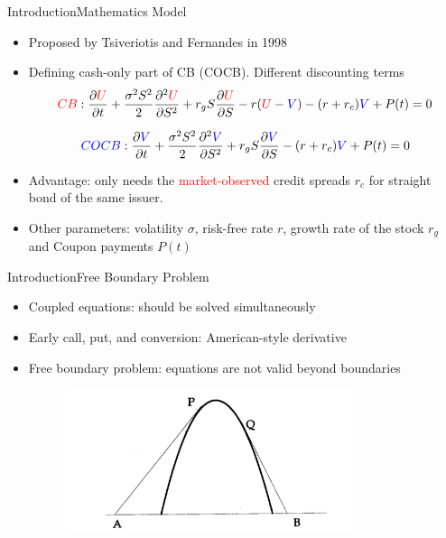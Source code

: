 \documentclass{beamer}
\begin{document}
\begin{frame}[shrink=10] {Introduction}{Mathematics Model}
	\begin{itemize}
		\item Proposed by Tsiveriotis and Fernandes in 1998
		\item Defining cash-only part of CB (COCB). Different discounting terms
\begin{equation*}
\textcolor{red}{CB}: \frac{\partial{\textcolor{red}{U}}}{\partial{t}} + 
\frac{\sigma^2S^2}{2}\frac{\partial^2{\textcolor{red}{U}}}{\partial{S}^2} + r_gS\frac{\partial{\textcolor{red}{U}}}{\partial{S}} - r(\textcolor{red}{U}-\textcolor{blue}{V}) - (r+r_c)\textcolor{blue}{V} + P(t) = 0 
\label{eq:CB}
\end{equation*}

\begin{equation*}
\textcolor{blue}{COCB}: \frac{\partial{\textcolor{blue}{V}}}{\partial{t}} + 
\frac{\sigma^2S^2}{2}\frac{\partial^2{\textcolor{blue}{V}}}{\partial{S}^2} + r_gS\frac{\partial{\textcolor{blue}{V}}}{\partial{S}} - (r+r_c)\textcolor{blue}{V} + P(t) = 0 
\label{eq:COCB}
\end{equation*}
	\item Advantage: only needs the \textcolor{red}{market-observed} credit spreads $r_c$ for straight bond of the same issuer.
	\item Other parameters: volatility $\sigma$, risk-free rate $r$, growth rate of the stock $r_g$ and Coupon payments $P(t)$  
	\end{itemize}
\end{frame}

\begin{frame} {Introduction}{Free Boundary Problem}
	\begin{itemize}
		\item Coupled equations: should be solved simultaneously
		\item Early call, put, and conversion: American-style derivative
		\item Free boundary problem: equations are not valid beyond boundaries
		\begin{figure}
		\centering
		\includegraphics[width=0.8\textwidth]{Figures/obstacle.png}
		\end{figure}
	\end{itemize}
\end{frame}
\end{document}
